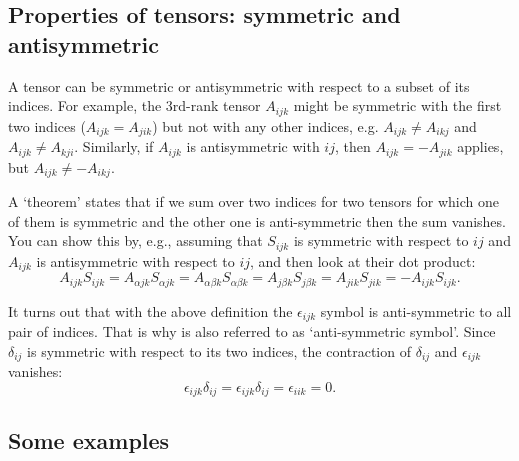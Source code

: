     
\subsection{Properties of tensors: symmetric and antisymmetric}

A tensor can be symmetric or antisymmetric with respect to a subset of its indices. For example, the 3rd-rank tensor $A_{ijk}$ might be symmetric with the first two indices ($A_{ijk}=A_{jik}$) but not with any other indices, e.g. $A_{ijk} \ne A_{ikj}$ and $A_{ijk} \ne A_{kji}$. Similarly, if $A_{ijk}$ is antisymmetric with $ij$, then $A_{ijk}=-A_{jik}$ applies, but $A_{ijk} \ne -A_{ikj}$.

A `theorem' states that if we sum over two indices for two tensors for which one of them is symmetric and the other one is anti-symmetric then the sum vanishes. You can show this by, e.g., assuming that $S_{ijk}$ is symmetric with respect to $ij$ and $A_{ijk}$ is antisymmetric with respect to $ij$, and then look at their dot product:
    \begin{equation}
        A_{ijk}S_{ijk} = A_{\alpha jk}S_{\alpha jk}= A_{\alpha \beta k}S_{\alpha \beta k} =
            A_{j \beta k}S_{j \beta k} =  A_{j i k}S_{j i k} = -A_{ijk}S_{ijk}.
    \end{equation}

It turns out that with the above definition the $\epsilon_{ijk}$ symbol is anti-symmetric to all pair of indices. That is why is also referred to as `anti-symmetric symbol'. Since $\delta_{ij}$ is symmetric with respect to its two indices, the contraction of $\delta_{ij}$ and $\epsilon_{ijk}$ vanishes:
    \begin{equation}
        \epsilon_{ijk} \delta_{ij} = \epsilon_{ijk} \delta_{ij} = \epsilon_{iik} = 0.
    \end{equation}

\subsection{Some examples}

